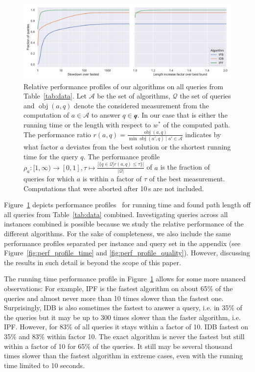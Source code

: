 \documentclass[a4paper,UKenglish,cleveref, autoref, thm-restate]{lipics-v2021}
\begin{document}
\begin{figure}
\centering
\includegraphics[width=\linewidth]{fig/combined_perf_profile.pdf}
\caption{
Relative performance profiles of our algorithms on all queries from Table~\ref{tab:data}.
Let $\mathcal{A}$ be the set of algorithms, $\mathcal{Q}$ the set of queries and $\operatorname{obj}(a, q)$ denote the considered measurement from the computation of $a \in \mathcal{A}$ to answer $q \in \mathcal{q}$.
In our case that is either the running time or the length with respect to $w^*$ of the computed path.
The performance ratio $r(a,q) = \frac{\operatorname{obj}(a, q)}{\min{\operatorname{obj}(a', q) \mid a' \in \mathcal{A}}}$ indicates by what factor $a$ deviates from the best solution or the shortest running time for the query $q$.
The performance profile $\rho_a : [1,\infty) \to [0,1], \tau \mapsto \frac{|\{q \in \mathcal{Q} | r(a, q) \leq \tau \}|}{|\mathcal{Q}|}$ of $a$ is the fraction of queries for which $a$ is within a factor of $\tau$ of the best measurement.
Computations that were aborted after 10\,s are not included.
}\label{fig:perf_profile}
\end{figure}

Figure~\ref{fig:perf_profile} depicts performance profiles~\cite{TODO} for running time and found path length off all queries from Table~\ref{tab:data} combined.
Investigating queries across all instances combined is possible because we study the relative performance of the different algorithms.
For the sake of completeness, we also include the same performance profiles separated per instance and query set in the appendix (see Figure~\ref{fig:perf_profile_time} and \ref{fig:perf_profile_quality}).
However, discussing the results in such detail is beyond the scope of this paper.

The running time performance profile in Figure~\ref{fig:perf_profile} allows for some more nuanced observations:
For example, IPF is the fastest algorithm on about 65\% of the queries and almost never more than 10 times slower than the fastest one.
Surprisingly, IDB is also sometimes the fastest to answer a query, i.e. in 35\% of the queries but it may be up to 300 times slower than the faster algorithm, i.e. IPF.
However, for 83\% of all queries it stays within a factor of 10.
IDB fastest on 35\% and 83\% within factor 10.
The exact algorithm is never the fastest but still within a factor of 10 for 65\% of the queries.
It still may be several thousand times slower than the fastest algorithm in extreme cases, even with the running time limited to 10 seconds.
\end{document}
